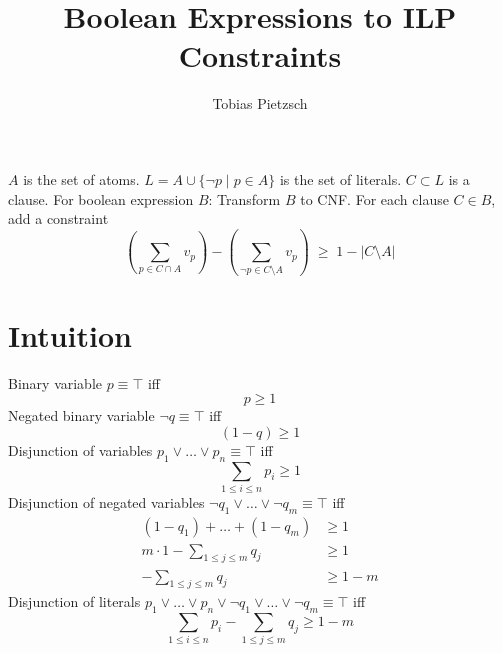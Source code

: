 \documentclass[a4paper]{article}
\newcommand{\set}[1]{\ensuremath{\{#1\}}}
\begin{document}
\title{Boolean Expressions to ILP Constraints}
\author{Tobias Pietzsch}
\maketitle

$A$ is the set of atoms. $L=A \cup \set{\neg p \;|\; p \in A}$ is the set of literals. $C \subset L$ is a clause.
For boolean expression $B$: Transform $B$ to CNF.
For each clause $C \in B$, add a constraint
$$
\left(\sum_{p \in C \cap A} v_p \right) - \left( \sum_{\neg p \in C \setminus A} v_p \right) \;\ge\; 1 - \left\vert{C \setminus A}\right\vert
$$


\section{Intuition}
Binary variable $p \equiv \top$ iff
\begin{equation}
	p \ge 1
\end{equation}
%
Negated binary variable $\neg q \equiv \top$ iff
\begin{equation}
	(1-q) \ge 1
\end{equation}
%
Disjunction of variables $p_1 \lor \dots \lor p_n  \equiv \top$ iff
\begin{equation}
	\sum_{1 \le i \le n} p_i \ge 1
\end{equation}
%
Disjunction of negated variables $\neg q_1 \lor \dots \lor \neg q_m  \equiv \top$ iff
\begin{align}
	(1-q_1) + \dots + (1-q_m) &\ge 1 \\
	m \cdot 1- \sum_{1 \le j \le m}q_j &\ge 1 \\
	- \sum_{1 \le j \le m}q_j &\ge 1 - m
\end{align}
%
Disjunction of literals $p_1 \lor \dots \lor p_n \lor \neg q_1 \lor \dots \lor \neg q_m  \equiv \top$ iff
\begin{equation}
	\sum_{1 \le i \le n} p_i - \sum_{1 \le j \le m}q_j \ge 1 - m
\end{equation}
%
\end{document}

